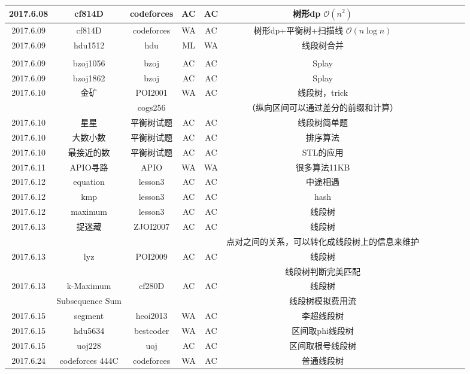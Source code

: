 \documentclass[landscape]{article}
\begin{document}
\begin{longtable}{ccccccccccc}
  \hline
  2017.6.08 & cf814D & codeforces & AC & AC & 树形dp $\mathcal O(n^2)$\\
  \hline
  2017.6.09 & cf814D & codeforces & WA & AC & 树形dp+平衡树+扫描线 $\mathcal O(n\log n)$\\
  \hline
  2017.6.09 & hdu1512 & hdu & ML & WA & 线段树合并\\
  & & & & & \color{red}{（拍了一万组没有出错，不知道怎么回事）}\\
  \hline
  2017.6.09 & bzoj1056 & bzoj & AC & AC & Splay\\
  \hline
  2017.6.09 & bzoj1862 & bzoj & AC & AC & Splay\\
  \hline
  2017.6.10 & 金矿 & POI2001 & WA & AC & 线段树，trick\\
  & & cogs256 & & & （纵向区间可以通过差分的前缀和计算）\\
  \hline
  2017.6.10 & 星星 & 平衡树试题 & AC & AC & 线段树简单题\\
  \hline
  2017.6.10 & 大数小数 & 平衡树试题 & AC & AC & 排序算法\\
  \hline
  2017.6.10 & 最接近的数 & 平衡树试题 & AC & AC & STL的应用\\
  \hline
  2017.6.11 & APIO寻路 & APIO & WA & WA & 很多算法11KB\\
  \hline
  2017.6.12 & equation & lesson3 & AC & AC & 中途相遇\\
  \hline
  2017.6.12 & kmp & lesson3 & AC & AC & hash\\
  \hline
  2017.6.12 & maximum & lesson3 & AC & AC & 线段树\\
  \hline
  2017.6.13 & 捉迷藏 & ZJOI2007 & AC & AC & 线段树\\
  & & & & & 点对之间的关系，可以转化成线段树上的信息来维护\\
  \hline
  2017.6.13 & lyz & POI2009 & AC & AC & 线段树\\
  & & & & & 线段树判断完美匹配\\
  \hline
  2017.6.13 & k-Maximum & cf280D & AC & AC & 线段树\\
  & Subsequence Sum & & & & 线段树模拟费用流\\
  \hline
  2017.6.15 & segment & heoi2013 & WA & AC & 李超线段树\\
  \hline
  2017.6.15 & hdu5634 & bestcoder & WA & AC & 区间取phi线段树\\
  \hline
  2017.6.15 & uoj228 & uoj & AC & AC & 区间取根号线段树\\
  \hline
  2017.6.24 & codeforces 444C & codeforces & WA & AC & 普通线段树\\

\end{longtable}
\end{document}
